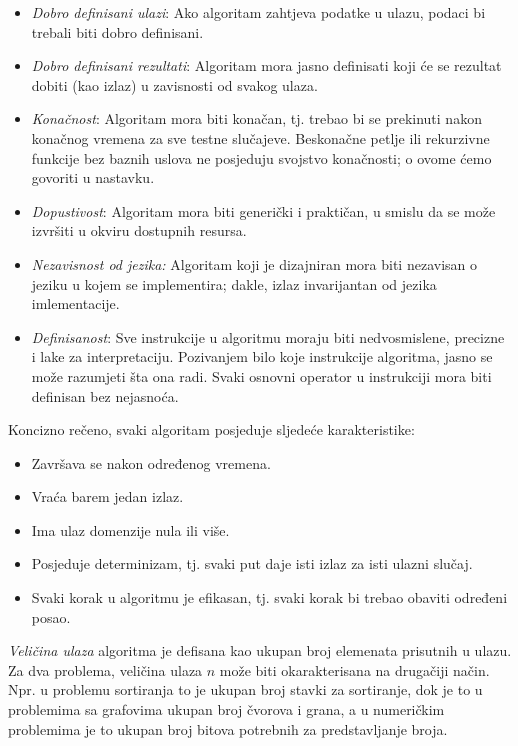 \begin{itemize}
    \item    \textit{Dobro definisani ulazi}: Ako algoritam zahtjeva podatke u ulazu, podaci bi trebali biti dobro definisani. 
    \item \textit{Dobro definisani rezultati}: Algoritam mora jasno definisati koji će se rezultat dobiti (kao izlaz) u zavisnosti od svakog ulaza. %
    \item    \textit{Konačnost}: Algoritam mora biti konačan, tj. trebao bi se prekinuti nakon konačnog vremena za sve testne slučajeve. Beskonačne petlje ili rekurzivne funkcije bez baznih uslova ne posjeduju svojstvo konačnosti; o ovome ćemo govoriti u nastavku.  
    \item  \textit{Dopustivost}: Algoritam mora biti generički i praktičan, u smislu da se može izvršiti u okviru dostupnih resursa.  %
      \item \textit{Nezavisnost od jezika:} Algoritam koji je dizajniran mora biti nezavisan o jeziku u kojem se implementira; dakle, izlaz invarijantan od jezika imlementacije.
      \item   \textit{Definisanost}: Sve instrukcije u algoritmu moraju biti nedvosmislene, precizne i lake za interpretaciju. Pozivanjem  bilo koje  instrukcije algoritma,   jasno se može razumjeti šta ona radi. Svaki osnovni operator u instrukciji mora biti definisan bez   nejasnoća.  
\end{itemize}
Koncizno rečeno, svaki algoritam posjeduje sljedeće karakteristike:  
\begin{itemize}
	\item Završava se nakon određenog vremena.
    \item Vraća barem jedan izlaz.
    \item Ima ulaz domenzije nula ili više.
    \item Posjeduje determinizam, tj. svaki put daje isti izlaz za isti ulazni slučaj.
    \item Svaki korak u algoritmu je efikasan, tj. svaki korak bi trebao obaviti određeni posao.
\end{itemize}

\textit{Veličina ulaza} algoritma je defisana kao ukupan broj elemenata prisutnih u ulazu. Za dva problema, veličina ulaza $n$ može biti okarakterisana na drugačiji način.  Npr.  u problemu sortiranja to  je ukupan broj stavki za sortiranje, dok je to  u problemima sa grafovima  ukupan broj čvorova i grana, a  u numeričkim problemima je to ukupan broj bitova potrebnih za predstavljanje broja. 

